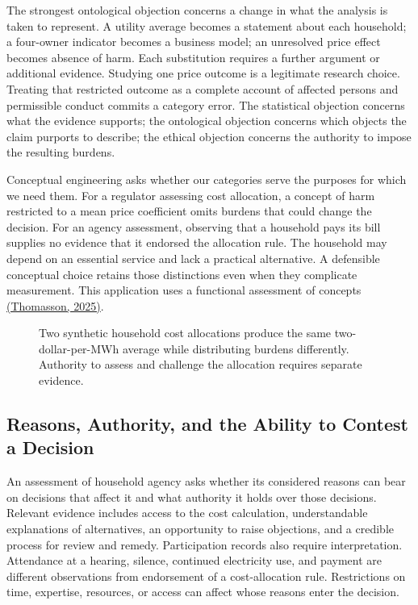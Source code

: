 The strongest ontological objection concerns a change in what the
analysis is taken to represent. A utility average becomes a statement
about each household; a four-owner indicator becomes a business model;
an unresolved price effect becomes absence of harm. Each substitution
requires a further argument or additional evidence. Studying one price
outcome is a legitimate research choice. Treating that restricted
outcome as a complete account of affected persons and permissible
conduct commits a category error. The statistical objection concerns
what the evidence supports; the ontological objection concerns which
objects the claim purports to describe; the ethical objection concerns
the authority to impose the resulting burdens.

Conceptual engineering asks whether our categories serve the purposes
for which we need them. For a regulator assessing cost allocation, a
concept of harm restricted to a mean price coefficient omits burdens
that could change the decision. For an agency assessment, observing that
a household pays its bill supplies no evidence that it endorsed the
allocation rule. The household may depend on an essential service and
lack a practical alternative. A defensible conceptual choice retains
those distinctions even when they complicate measurement. This
application uses a functional assessment of concepts
\href{https://doi.org/10.1093/9780197787830.003.0011}{(Thomasson,
2025)}.

\begin{figure}[htbp]
\centering

\caption{Two synthetic household cost allocations produce the same two-dollar-per-MWh average while distributing burdens differently. Authority to assess and challenge the allocation requires separate evidence.}\label{fig:M09_household_incidence_and_agency}
\end{figure}

\hypertarget{M09-reasons-authority-and-the-ability-to-contest-a-decision}{%
\subsection{Reasons, Authority, and the Ability to Contest a
Decision}\label{M09-reasons-authority-and-the-ability-to-contest-a-decision}}

\noindent \noindent An assessment of household agency asks whether its considered
reasons can bear on decisions that affect it and what authority it holds
over those decisions. Relevant evidence includes access to the cost
calculation, understandable explanations of alternatives, an opportunity
to raise objections, and a credible process for review and remedy.
Participation records also require interpretation. Attendance at a
hearing, silence, continued electricity use, and payment are different
observations from endorsement of a cost-allocation rule. Restrictions on
time, expertise, resources, or access can affect whose reasons enter the
decision.


